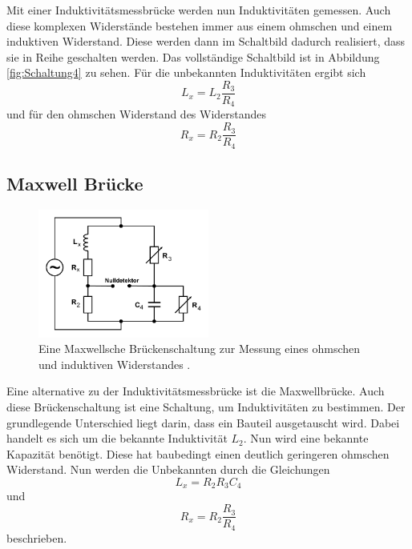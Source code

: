 Mit einer Induktivitätsmessbrücke werden nun Induktivitäten gemessen.
Auch diese komplexen Widerstände bestehen immer aus einem ohmschen und einem induktiven Widerstand.
Diese werden dann im Schaltbild dadurch realisiert, dass sie in Reihe geschalten werden.
Das vollständige Schaltbild ist in Abbildung \ref{fig:Schaltung4} zu sehen.
Für die unbekannten Induktivitäten ergibt sich
\begin{equation}
    L_x = L_2 \frac{R_3}{R_4}
\end{equation}
und für den ohmschen Widerstand des Widerstandes
\begin{equation}
    R_x = R_2 \frac{R_3}{R_4}
\end{equation}

\subsection{Maxwell Brücke}
\begin{figure}
    \centering
    \includegraphics[width=0.5\textwidth]{pictures/schaltung5.pdf}
    \caption{Eine Maxwellsche Brückenschaltung zur Messung eines ohmschen und induktiven Widerstandes \cite[7]{v302}.}
    \label{fig:Schaltung5}
\end{figure}

Eine alternative zu der Induktivitätsmessbrücke ist die Maxwellbrücke.
Auch diese Brückenschaltung ist eine Schaltung, um Induktivitäten zu bestimmen.
Der grundlegende Unterschied liegt darin, dass ein Bauteil ausgetauscht wird.
Dabei handelt es sich um die bekannte Induktivität $L_2$.
Nun wird eine bekannte Kapazität benötigt.
Diese hat baubedingt einen deutlich geringeren ohmschen Widerstand.
Nun werden die Unbekannten durch die Gleichungen
\begin{equation}
    L_x = R_2 R_3 C_4
\end{equation}
und 
\begin{equation}
    R_x = R_2 \frac{R_3}{R_4}
\end{equation}
beschrieben.

